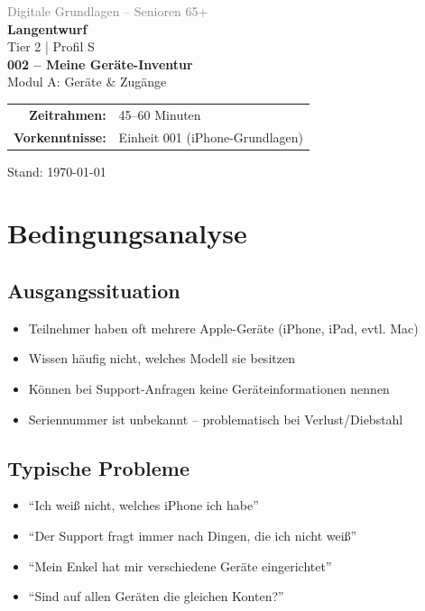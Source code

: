\documentclass[11pt,a4paper]{article}
\begin{document}
\begin{titlepage}
    \centering
    \vspace*{2cm}
    {\Large\textcolor{gray}{Digitale Grundlagen -- Senioren 65+}}\\[2cm]
    {\Huge\textcolor{fach}{\textbf{Langentwurf}}}\\[0.5cm]
    {\large Tier 2 | Profil S}\\[2cm]
    {\LARGE\textbf{002 -- Meine Geräte-Inventur}}\\[0.5cm]
    {\large Modul A: Geräte \& Zugänge}\\[2cm]
    \begin{tabular}{rl}
        \textbf{Zeitrahmen:} & 45--60 Minuten \\
        \textbf{Vorkenntnisse:} & Einheit 001 (iPhone-Grundlagen) \\
    \end{tabular}
    \vfill
    {\normalsize Stand: \today}
\end{titlepage}

\tableofcontents
\newpage

\section{Bedingungsanalyse}

\subsection{Ausgangssituation}
\begin{itemize}
    \item Teilnehmer haben oft mehrere Apple-Geräte (iPhone, iPad, evtl. Mac)
    \item Wissen häufig nicht, welches Modell sie besitzen
    \item Können bei Support-Anfragen keine Geräteinformationen nennen
    \item Seriennummer ist unbekannt -- problematisch bei Verlust/Diebstahl
\end{itemize}

\subsection{Typische Probleme}
\begin{itemize}
    \item ``Ich weiß nicht, welches iPhone ich habe''
    \item ``Der Support fragt immer nach Dingen, die ich nicht weiß''
    \item ``Mein Enkel hat mir verschiedene Geräte eingerichtet''
    \item ``Sind auf allen Geräten die gleichen Konten?''
\end{itemize}
\end{document}

